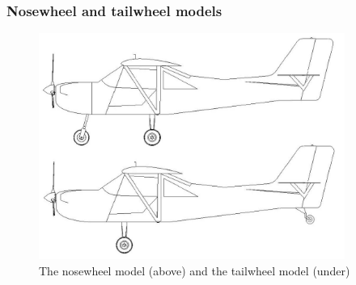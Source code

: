 \documentclass[11pt,a4paper]{article}
\begin{document}

\subsubsection{Nosewheel and tailwheel models}

\begin{figure}[ht!]
	\begin{center}
		\includegraphics[width=10cm]{pics/PIC018.jpg}
		\caption{The nosewheel model (above) and the tailwheel model (under)}
		\label{fig:PIC018}
	\end{center}
\end{figure}

\end{document}
